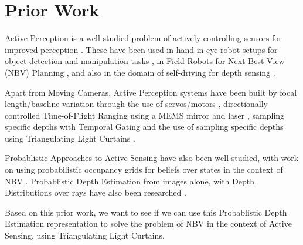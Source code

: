 \section{Prior Work}

Active Perception is a well studied problem of actively controlling sensors for improved perception \cite{bajcsy1988active} \cite{wilkes1994active} \cite{DBLP:journals/corr/BajcsyAT16} \cite{DBLP:journals/corr/abs-1811-08067}. These have been used in hand-in-eye robot setups for object detection and manipulation tasks \cite{sergey2017} \cite{7759446}, in Field Robots for Next-Best-View (NBV) Planning \cite{coslam2012} \cite{8098709} \cite{7989679}, and also in the domain of self-driving for depth sensing \cite{Ancha_2020_ECCV} \cite{9105252}.

Apart from Moving Cameras, Active Perception systems have been built by focal length/baseline variation through the use of servos/motors \cite{Mohamed2018ActiveSP} \cite{4587671} \cite{Nakabo2005VariableBS} \cite{Schneider2018VisuallyGV}, directionally controlled Time-of-Flight Ranging using a MEMS mirror and laser \cite{dtof} \cite{9105183} \cite{pittaluga2020} \cite{8369664}, sampling specific depths with Temporal Gating \cite{10.1117/12.2078169} and the use of sampling specific depths using Triangulating Light Curtains \cite{bartels2019Agile} \cite{wang2018programmable}.

Probablistic Approaches to Active Sensing have also been well studied, with work on using probabilistic occupancy grids for beliefs over states in the context of NBV \cite{isler2016information} \cite{kriegel2015efficient} \cite{8369664} \cite{Ancha_2020_ECCV} \cite{daudelin2017adaptable}. Probablistic Depth Estimation from images alone, with Depth Distributions over rays have also been researched \cite{liu2019neural} \cite{yang2019inferring} \cite{chang2018pyramid}.

Based on this prior work, we want to see if we can use this Probablistic Depth Estimation representation to solve the problem of NBV in the context of Active Sensing, using Triangulating Light Curtains.
